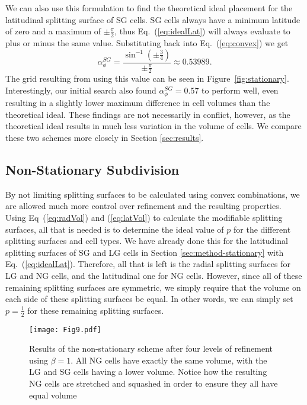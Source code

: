 We can also use this formulation to find the theoretical ideal placement for the latitudinal splitting surface of SG cells.
SG cells always have a minimum latitude of zero and a maximum of $\pm \frac{\pi}{2}$, thus Eq.~(\ref{eq:idealLat}) will always evaluate to plus or minus the same value.
Substituting back into Eq.~(\ref{eq:convex}) we get
%
\begin{equation} \label{eq:latValue}
\alpha_{\phi}^{SG} = \frac{ \sin^{-1} \left( \pm \frac{3}{4} \right) }{ \pm \frac{\pi}{2} } \approx 0.53989.
\end{equation}
%
The grid resulting from using this value can be seen in Figure~\ref{fig:stationary}.
Interestingly, our initial search also found $\alpha_{\phi}^{SG} = 0.57$ to perform well, even resulting in a slightly lower maximum difference in cell volumes than the theoretical ideal.
These findings are not necessarily in conflict, however, as the theoretical ideal results in much less variation in the volume of cells.
We compare these two schemes more closely in Section \ref{sec:results}.


\subsection{Non-Stationary Subdivision} \label{sec:method-nonStationary}
By not limiting splitting surfaces to be calculated using convex combinations, we are allowed much more control over refinement and the resulting properties.
Using Eq~(\ref{eq:radVol}) and (\ref{eq:latVol}) to calculate the modifiable splitting surfaces, all that is needed is to determine the ideal value of $p$ for the different splitting surfaces and cell types.
We have already done this for the latitudinal splitting surfaces of SG and LG cells in Section \ref{sec:method-stationary} with Eq.~(\ref{eq:idealLat}).
Therefore, all that is left is the radial splitting surfaces for LG and NG cells, and the latitudinal one for NG cells.
However, since all of these remaining splitting surfaces are symmetric, we simply require that the volume on each side of these splitting surfaces be equal.
In other words, we can simply set $p = \frac{1}{2}$ for these remaining splitting surfaces.


\begin{figure}[tb]
	\texttt{[image: Fig9.pdf]}
	\caption[Title]{
		Results of the non-stationary scheme after four levels of refinement using $\beta = 1$.
		All NG cells have exactly the same volume, with the LG and SG cells having a lower volume.
		Notice how the resulting NG cells are stretched and squashed in order to ensure they all have equal volume
	}
	\label{fig:perfect}
\end{figure}


